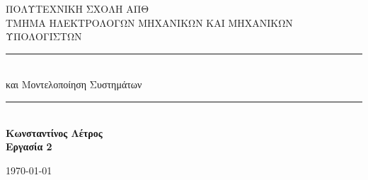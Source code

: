 \documentclass[12pt]{article}
\begin{document}
\author{Κωνσταντίνος Λέτρος 8851}

 \begin{titlepage} %
	\newcommand{\HRule}{\rule{\linewidth}{0.5mm}} %
	
	\center %
	
	
	\textsc{\LARGE ΠΟΛΥΤΕΧΝΙΚΗ ΣΧΟΛΗ ΑΠΘ}\\[1.5cm] %
	
	\textsc{\Large ΤΜΗΜΑ ΗΛΕΚΤΡΟΛΟΓΩΝ ΜΗΧΑΝΙΚΩΝ ΚΑΙ ΜΗΧΑΝΙΚΩΝ ΥΠΟΛΟΓΙΣΤΩΝ}\\[0.5cm] %
	
	 
	
	
	\HRule\\[0.4cm]
	
	{\huge{} και Μοντελοποίηση Συστημάτων}\\[0.4cm] %
	
	\HRule\\[1.5cm]
	
	{\huge\bfseries Κωνσταντίνος Λέτρος }\\[0.4cm]	
	\vfill	
	{\huge\bfseries Εργασία 2}\\[0.4cm]  %
	
	
	\vfill\vfill\vfill %
	
	{\large\today} %
	
	
	 
	
	\vfill %
	
\end{titlepage}
\end{document}
